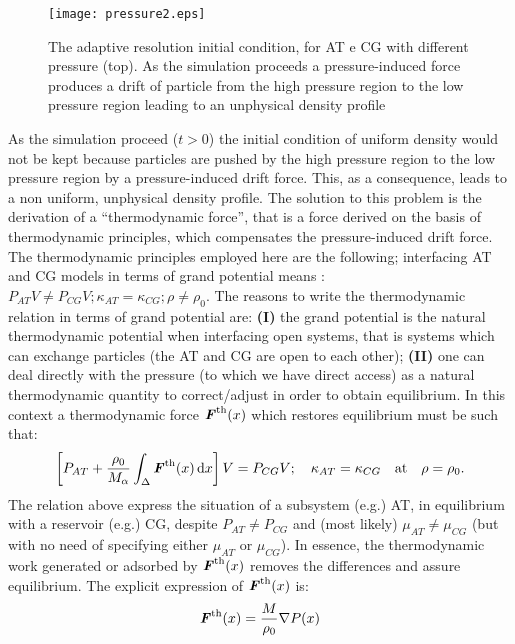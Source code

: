 \documentclass[aps,pre,preprint]{revtex4}
\renewcommand{\v}[1]{\textbf{\textit{#1}}}
\begin{document}
\begin{figure}
  \centering
  \texttt{[image: pressure2.eps]}
  \caption{The adaptive resolution initial condition, for AT e CG with different pressure (top). As the simulation proceeds a pressure-induced force produces a drift of particle from the high pressure region to the low pressure region leading to an unphysical density profile}
  \label{figpress}
\end{figure} 


As the simulation proceed ($t>0$) the initial condition of uniform density would not be kept because particles are pushed by the high pressure region to the low pressure region by a pressure-induced drift force. This, as a consequence, leads to a non uniform, unphysical density profile. The solution to this problem is the derivation of a ``thermodynamic force'', that is a force derived on the basis of thermodynamic principles, which compensates the pressure-induced drift force. The thermodynamic principles employed here are the following; interfacing AT and CG models in terms of grand potential means :$P_{AT}V\neq P_{CG}V; \kappa_{AT} =  \kappa_{CG}; \rho\neq \rho_{0}$. The reasons to write the thermodynamic relation in terms of grand potential are: {\bf (I)}  the grand potential is the natural thermodynamic potential when interfacing open systems, that is systems which can exchange particles (the AT and CG are open to each other); {\bf (II)} one can deal directly with the pressure (to which we have direct access) as a natural thermodynamic quantity to correct/adjust in order to obtain equilibrium. In this context a thermodynamic force ${\v F}^{\textrm{th}}(x)$ which restores equilibrium must be such that: 
\begin{equation}
\left[P_{AT}+ \frac{\rho_{0}}{M_\alpha}\int_{\Delta} {\v F}^\text{th}(x)\,\text{d}x\right] V =P_{CG}V; \quad\kappa_{AT} =  \kappa_{CG}\quad \text{at}\quad\rho=\rho_{0}.
\label{thf}
\end{equation}
The relation above express the situation of a subsystem (e.g.) AT, in equilibrium with a reservoir (e.g.) CG, despite $P_{AT}\neq P_{CG}$ and
(most likely) $\mu_{AT}\neq\mu_{CG}$ (but with no need of specifying either $\mu_{AT}$ or $\mu_{CG}$). In essence, the thermodynamic work generated or adsorbed by ${\v F}^{\textrm{th}}(x)$ removes the differences and assure equilibrium. The explicit expression of ${\v F}^{\textrm{th}}(x)$ is:
\begin{equation}
{\v F}^{\textrm{th}}(x)=\frac{M}{\rho_{0}}\nabla P(x)
\label{explexpr}
\end{equation}
\end{document}
